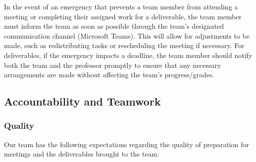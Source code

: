 \documentclass{article}
\begin{document}
In the event of an emergency that prevents a team member from attending a meeting or completing
their assigned work for a deliverable, the team member must inform the team as soon as possible
through the team's designated communication channel (Microsoft Teams). This will
allow for adjustments to be made, such as redistributing tasks or rescheduling the meeting if necessary.
For deliverables, if the emergency impacts a deadline, the team member should notify both the team and the professor promptly to ensure that any necessary
arrangements are made without affecting the team's progress/grades.

\subsection*{Accountability and Teamwork}

\subsubsection*{Quality} 
Our team has the following expectations regarding the quality of preparation for meetings and the deliverables brought to the team:
\end{document}
